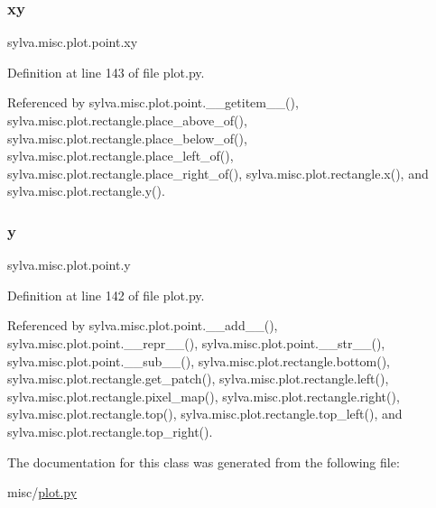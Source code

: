 \mbox{\label{classsylva_1_1misc_1_1plot_1_1point_a0343c9245053942c8de7e013a9c7d450}} 
\subsubsection{\texorpdfstring{xy}{xy}}
{\footnotesize\ttfamily sylva.\+misc.\+plot.\+point.\+xy}



Definition at line 143 of file plot.\+py.



Referenced by sylva.\+misc.\+plot.\+point.\+\_\+\+\_\+getitem\+\_\+\+\_\+(), sylva.\+misc.\+plot.\+rectangle.\+place\+\_\+above\+\_\+of(), sylva.\+misc.\+plot.\+rectangle.\+place\+\_\+below\+\_\+of(), sylva.\+misc.\+plot.\+rectangle.\+place\+\_\+left\+\_\+of(), sylva.\+misc.\+plot.\+rectangle.\+place\+\_\+right\+\_\+of(), sylva.\+misc.\+plot.\+rectangle.\+x(), and sylva.\+misc.\+plot.\+rectangle.\+y().

\mbox{\label{classsylva_1_1misc_1_1plot_1_1point_ac2bc4268769be52f4443f74b619cd781}} 
\subsubsection{\texorpdfstring{y}{y}}
{\footnotesize\ttfamily sylva.\+misc.\+plot.\+point.\+y}



Definition at line 142 of file plot.\+py.



Referenced by sylva.\+misc.\+plot.\+point.\+\_\+\+\_\+add\+\_\+\+\_\+(), sylva.\+misc.\+plot.\+point.\+\_\+\+\_\+repr\+\_\+\+\_\+(), sylva.\+misc.\+plot.\+point.\+\_\+\+\_\+str\+\_\+\+\_\+(), sylva.\+misc.\+plot.\+point.\+\_\+\+\_\+sub\+\_\+\+\_\+(), sylva.\+misc.\+plot.\+rectangle.\+bottom(), sylva.\+misc.\+plot.\+rectangle.\+get\+\_\+patch(), sylva.\+misc.\+plot.\+rectangle.\+left(), sylva.\+misc.\+plot.\+rectangle.\+pixel\+\_\+map(), sylva.\+misc.\+plot.\+rectangle.\+right(), sylva.\+misc.\+plot.\+rectangle.\+top(), sylva.\+misc.\+plot.\+rectangle.\+top\+\_\+left(), and sylva.\+misc.\+plot.\+rectangle.\+top\+\_\+right().



The documentation for this class was generated from the following file\+:\begin{DoxyCompactItemize}
\item 
misc/\hyperlink{plot_8py}{plot.\+py}\end{DoxyCompactItemize}
